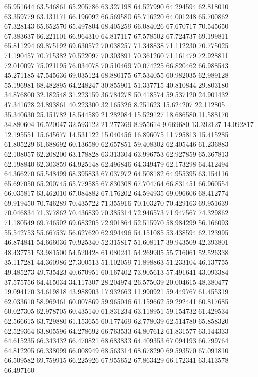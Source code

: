 65.951644
63.546861
65.205786
63.327198
64.527990
64.294594
62.818010
63.359779
63.131171
66.196092
66.569580
65.716220
64.001248
65.700862
67.328143
65.652570
65.497804
68.405259
66.084026
67.670717
70.545650
67.383637
66.221101
66.964310
64.817117
67.578502
67.724737
69.199811
65.811294
69.875192
69.630572
70.038257
71.348838
71.112230
70.775025
71.190457
70.715382
70.522097
70.303891
70.361260
71.161479
72.928811
72.010097
75.021195
76.034078
70.510469
70.074225
66.820462
66.988543
45.271185
47.545636
69.035124
68.880175
67.534055
60.982035
62.989128
55.196981
68.482895
64.248247
30.855901
51.337715
40.810844
29.803180
34.876800
32.182548
31.223159
36.784278
50.418574
59.537120
24.901432
47.341628
24.893861
40.223300
32.165326
8.251623
15.624207
22.112805
35.340630
25.151782
18.544589
21.282084
15.529127
18.686580
11.588170
34.880604
16.520047
32.593122
21.277369
8.955614
9.669680
13.392127
14.092817
12.195551
15.645677
14.531122
15.040456
16.896075
11.795813
15.415285
61.805229
61.688692
60.136580
62.657851
59.408302
62.405446
61.236883
62.108057
62.208200
63.178828
63.313304
63.996753
62.927859
65.367813
62.198840
62.303859
64.925148
62.496846
64.349479
62.173298
64.412494
64.366270
65.548499
68.395833
67.037972
64.508182
64.955395
63.154116
65.697050
65.200745
65.779585
67.830308
67.704764
66.831451
66.960554
66.035817
63.462010
67.084882
67.176202
64.594935
69.096606
68.412774
69.919450
70.746289
70.435722
71.355916
70.103270
70.429163
69.951639
70.046834
71.377862
70.436839
70.385314
72.946573
71.947567
74.329862
71.180549
69.746502
69.683205
72.901864
52.515970
58.984299
56.166093
55.542753
55.667537
56.627620
62.994496
54.151085
53.438594
62.123995
46.874841
54.666036
70.925340
52.315817
51.608117
39.943509
42.393801
48.437751
53.981500
54.520428
61.080241
54.269905
55.716061
52.526338
35.117281
44.360986
27.300513
51.102059
71.898863
51.233104
46.137755
49.485273
49.735423
40.670951
60.167402
73.905613
57.491641
43.093384
37.575756
64.415034
34.117307
28.204974
26.575039
20.004615
48.380477
19.094170
34.619818
43.988903
17.932663
11.990921
59.449767
61.455319
62.033610
58.969461
60.007869
59.965046
61.159662
59.292441
60.817685
60.027305
62.978705
60.435140
61.831234
63.118951
59.154732
61.429534
62.566615
63.729880
61.153655
60.177469
62.778039
62.514780
65.858320
62.529364
63.805596
64.278692
66.763533
64.807612
61.831577
63.144333
64.615235
66.343432
66.470821
68.683833
64.409353
67.094193
66.799764
64.812205
66.338099
66.008949
68.563314
68.678290
69.593570
67.091810
66.509582
69.759915
66.225926
67.955652
67.863429
66.172341
63.413578
66.497160
